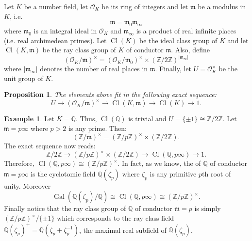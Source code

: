 \documentclass[12pt]{article}
\newtheorem*{prop}{Proposition}
\theoremstyle{definition}
\newtheorem{exa}{Example}
\newcommand{\Ints}{\mathbb{Z}}
\newcommand{\Rats}{\mathbb{Q}}
\newcommand{\Gal}{\operatorname{Gal}}
\newcommand{\Cl}{\operatorname{Cl}}
\begin{document}
Let $K$ be a number field, let $\mathcal{O}_K$ be its ring of integers and let $\mathfrak{m}$ be a modulus in $K$, i.e. 
$$\mathfrak{m}=\mathfrak{m}_0\mathfrak{m}_\infty$$
where $\mathfrak{m}_0$ is an integral ideal in $\mathcal{O}_K$ and $\mathfrak{m}_\infty$ is a product of real infinite places (i.e. real archimedean primes). Let $\Cl(K)$ be the ideal class group of $K$ and let $\Cl(K,\mathfrak{m})$ be the ray class group of $K$ of conductor $\mathfrak{m}$. Also, define
$$(\mathcal{O}_K/\mathfrak{m})^\times=(\mathcal{O}_K/\mathfrak{m}_0)^\times \times (\Ints/2\Ints)^{|\mathfrak{m}_\infty|}$$
where $|\mathfrak{m}_\infty|$ denotes the number of real places in $\mathfrak{m}$. Finally, let $U=\mathcal{O}_K^\times$ be the unit group of $K$.

\begin{prop}
The elements above fit in the following exact sequence:
$$U\longrightarrow (\mathcal{O}_K/\mathfrak{m})^\times\longrightarrow \Cl(K,\mathfrak{m})\longrightarrow \Cl(K)\longrightarrow 1.$$
\end{prop}

\begin{exa}
Let $K=\Rats$. Thus, $\Cl(\Rats)$ is trivial and $U=\{ \pm 1\}\cong \Ints/2\Ints$. Let $\mathfrak{m}=p\infty$ where $p>2$ is any prime. Then:
$$(\Ints/\mathfrak{m})^\times=(\Ints/p\Ints)^\times \times (\Ints/2\Ints).$$
The exact sequence now reads:
$$\Ints/2\Ints\longrightarrow (\Ints/p\Ints)^\times \times (\Ints/2\Ints)\longrightarrow \Cl(\Rats,p\infty)\longrightarrow 1.$$
Therefore, $\Cl(\Rats,p\infty)\cong (\Ints/p\Ints)^\times$. In fact, as we know, the  of $\Rats$ of conductor $\mathfrak{m}=p\infty$ is the cyclotomic field $\Rats(\zeta_p)$ where $\zeta_p$ is any primitive $p$th root of unity. Moreover $$\Gal(\Rats(\zeta_p)/\Rats)\cong \Cl(\Rats,p\infty)\cong (\Ints/p\Ints)^\times.$$ 
Finally notice that the ray class group of $\Rats$ of conductor $\mathfrak{m}=p$ is simply $(\Ints/p\Ints)^\times/\{\pm 1 \}$ which corresponds to the ray class field $\Rats(\zeta_p)^+=\Rats(\zeta_p+\zeta_p^{-1})$, the maximal real subfield of $\Rats(\zeta_p)$.
\end{exa}
\end{document}
